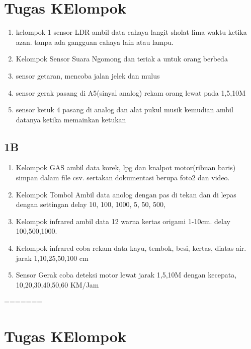 
\section{Tugas KElompok}

\begin{enumerate}
\item  kelompok 1 sensor LDR
ambil data cahaya langit sholat lima waktu ketika azan. tanpa ada gangguan cahaya lain atau lampu.

\item Kelompok Sensor Suara
Ngomong dan teriak a untuk orang berbeda

\item sensor getaran, mencoba jalan jelek dan mulus

\item sensor gerak
pasang di A5(sinyal analog) rekam orang lewat pada 1,5,10M


\item sensor ketuk 4
pasang di analog dan alat pukul musik kemudian ambil datanya ketika memainkan ketukan
\end{enumerate}


\subsection{1B}
\begin{enumerate}
\item Kelompok GAS
ambil data korek, lpg dan knalpot motor(ribuan baris) simpan dalam file csv. sertakan dokumentasi berupa foto2 dan video.

\item Kelompok Tombol
Ambil data anolog dengan pas di tekan dan di lepas dengan settingan delay 10, 100, 1000, 5, 50, 500,

\item Kelompok infrared
ambil data 12 warna kertas origami 1-10cm. delay 100,500,1000.

\item Kelompok infrared
coba rekam data kayu, tembok, besi, kertas, diatas air. jarak 1,10,25,50,100 cm 

\item Sensor Gerak
coba deteksi motor lewat jarak 1,5,10M dengan kecepata, 10,20,30,40,50,60 KM/Jam
\end{enumerate}

=======
\section{Tugas KElompok}

